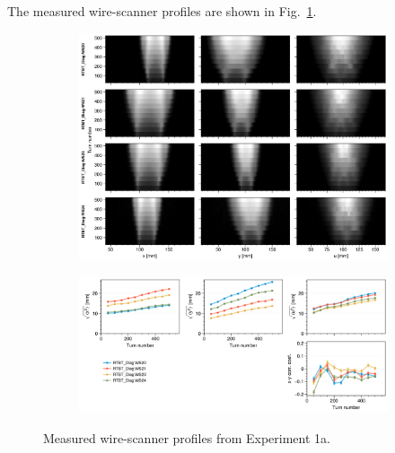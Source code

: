 The measured wire-scanner profiles are shown in Fig.~\ref{fig:exp1a_wsmeas}.
%
\begin{figure}[!p]
    \centering
    \begin{subfigure}{\textwidth}
        \includegraphics[width=\textwidth]{Images/chapter5/exp1a/waterfall.png}
    \end{subfigure}
    \vfill
    \vspace*{1.25cm}
    \vfill
    \begin{subfigure}{\textwidth}
        \includegraphics[width=\textwidth]{Images/chapter5/exp1a/rms.png}
    \end{subfigure}
    \caption{Measured wire-scanner profiles from Experiment 1a.}
    \label{fig:exp1a_wsmeas}
\end{figure}
%
%
